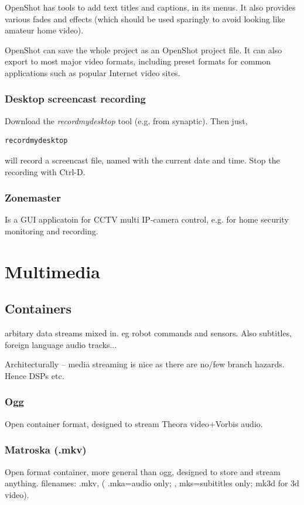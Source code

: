 \documentclass[oneside,english]{scrbook}
\begin{document}
OpenShot has tools to add text titles and captions, in its menus.  It also provides various fades and effects (which should be used sparingly to avoid looking like amateur home video).

OpenShot can save the whole project as an OpenShot project file.  It can also export to most major video formats, including preset formats for common applications such as popular Internet video sites.



\section{Desktop screencast recording}

Download the {\em recordmydesktop} tool (e.g. from synaptic). Then just,
\begin{lstlisting}
recordmydesktop
\end{lstlisting}
will record a screencast file, named with the current date and time.  Stop the recording with Ctrl-D.


\section{Zonemaster}
Is a GUI applicatoin for CCTV multi IP-camera control, e.g. for home security monitoring and recording.




\part{Multimedia}


\chapter{Containers}

arbitary data streams mixed in. eg robot commands and sensors. Also
subtitles, foreign language audio tracks...

Architecturally -- media streaming is nice as there are no/few branch hazards. Hence DSPs etc.

\section{Ogg}
Open container format, designed to stream Theora video+Vorbis audio.

\section{Matroska (.mkv)}
Open format container, more general than ogg, designed to store and stream anything.
filenames: .mkv,  ( .mka=audio only; , mks=subititles only; mk3d for 3d video).
\end{document}
